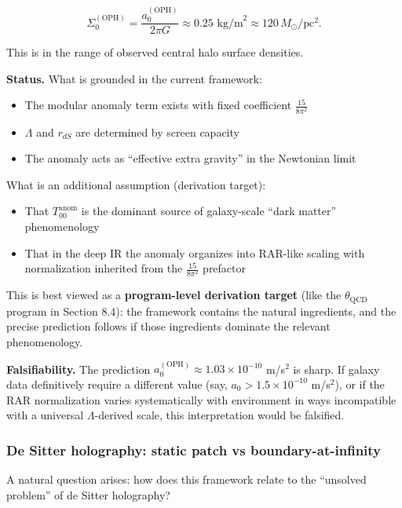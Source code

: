 \documentclass[11pt,a4paper]{article}
\theoremstyle{remark}
\providecommand{\tightlist}{%
  \setlength{\itemsep}{0pt}\setlength{\parskip}{0pt}}
\begin{document}
\[
\Sigma_0^{\mathrm{(OPH)}} = \frac{a_0^{\mathrm{(OPH)}}}{2\pi G}
\approx 0.25 \text{ kg/m}^2 \approx 120 \, M_\odot/\text{pc}^2.
\]

This is in the range of observed central halo surface densities.

\textbf{Status.} What is grounded in the current framework:

\begin{itemize}
\tightlist
\item
  The modular anomaly term exists with fixed coefficient \(\frac{15}{8\pi^2}\)
\item
  \(\Lambda\) and \(r_{dS}\) are determined by screen capacity
\item
  The anomaly acts as ``effective extra gravity'' in the Newtonian limit
\end{itemize}

What is an additional assumption (derivation target):

\begin{itemize}
\tightlist
\item
  That \(T_{00}^{\mathrm{anom}}\) is the dominant source of galaxy-scale
  ``dark matter'' phenomenology
\item
  That in the deep IR the anomaly organizes into RAR-like scaling with
  normalization inherited from the \(\frac{15}{8\pi^2}\) prefactor
\end{itemize}

This is best viewed as a \textbf{program-level derivation target} (like the
\(\theta_{\mathrm{QCD}}\) program in Section 8.4): the framework contains
the natural ingredients, and the precise prediction follows if those
ingredients dominate the relevant phenomenology.

\textbf{Falsifiability.} The prediction \(a_0^{\mathrm{(OPH)}} \approx 1.03 \times
10^{-10}\) m/s\(^2\) is sharp. If galaxy data definitively require a different
value (say, \(a_0 > 1.5 \times 10^{-10}\) m/s\(^2\)), or if the RAR normalization
varies systematically with environment in ways incompatible with a universal
\(\Lambda\)-derived scale, this interpretation would be falsified.

\subsubsection{De Sitter holography: static patch vs boundary-at-infinity}\label{de-sitter-holography-static-patch-vs-boundary-at-infinity}

A natural question arises: how does this framework relate to the ``unsolved
problem'' of de Sitter holography?
\end{document}
